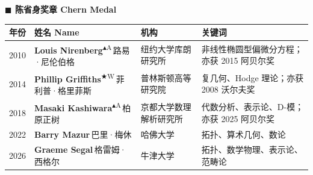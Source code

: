 \documentclass[a4paper,10pt]{article}
\newcommand{\Wbadge}{\textsuperscript{\normalfont\scriptsize\sffamily\color{wolfclr}$\bigstar$W}}
\newcommand{\Abadge}{\textsuperscript{\normalfont\scriptsize\sffamily\color{abelclr}$\blacktriangle$A}}
\begin{document}
\vspace{0.6em}

\begin{center}{\Large\bfseries\sffamily\color{chernclr} $\blacksquare$ 陈省身奖章 Chern Medal}\end{center}
\vspace{0.3em}
\begin{longtable}{
  >{\raggedright}m{1.4cm}
  >{\raggedright}m{6.5cm}
  >{\raggedright}m{5.5cm}
  >{\raggedright\arraybackslash}m{9.0cm}
}
\toprule
\rowcolor{headerbg}
\textbf{\sffamily 年份} & \textbf{\sffamily 姓名 Name} & \textbf{\sffamily 机构} & \textbf{\sffamily 关键词} \\
\midrule
\endhead
{\color{yearcolor}2010} & {\bfseries Louis Nirenberg}\Abadge\,{\small\color{mutedgray}路易·尼伦伯格} & 纽约大学库朗研究所 & {\small\color{fieldcolor}非线性椭圆型偏微分方程；亦获 2015 阿贝尔奖} \\[2pt]
{\color{yearcolor}2014} & {\bfseries Phillip Griffiths}\Wbadge\,{\small\color{mutedgray}菲利普·格里菲斯} & 普林斯顿高等研究院 & {\small\color{fieldcolor}复几何、Hodge 理论；亦获 2008 沃尔夫奖} \\[2pt]
{\color{yearcolor}2018} & {\bfseries Masaki Kashiwara}\Abadge\,{\small\color{mutedgray}柏原正树} & 京都大学数理解析研究所 & {\small\color{fieldcolor}代数分析、表示论、D-模；亦获 2025 阿贝尔奖} \\[2pt]
{\color{yearcolor}2022} & {\bfseries Barry Mazur}\,{\small\color{mutedgray}巴里·梅休} & 哈佛大学 & {\small\color{fieldcolor}拓扑、算术几何、数论} \\[2pt]
{\color{yearcolor}2026} & {\bfseries Graeme Segal}\,{\small\color{mutedgray}格雷姆·西格尔} & 牛津大学 & {\small\color{fieldcolor}拓扑、数学物理、表示论、范畴论} \\[2pt]
\bottomrule
\end{longtable}

\vspace{0.6em}
\end{document}
